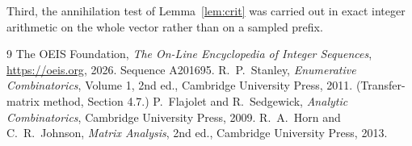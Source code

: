 \documentclass[11pt,a4paper]{article}
\theoremstyle{plain}
\theoremstyle{definition}
\begin{document}
Third, the annihilation test of Lemma~\ref{lem:crit} was carried out in exact integer
arithmetic on the whole vector rather than on a sampled prefix.

\begin{thebibliography}{9}
 The OEIS Foundation, \emph{The On-Line Encyclopedia of Integer
Sequences}, \url{https://oeis.org}, 2026. Sequence A201695.
 R.~P.~Stanley, \emph{Enumerative Combinatorics}, Volume 1, 2nd ed.,
Cambridge University Press, 2011. (Transfer-matrix method, Section 4.7.)
 P.~Flajolet and R.~Sedgewick, \emph{Analytic Combinatorics}, Cambridge
University Press, 2009.
 R.~A.~Horn and C.~R.~Johnson, \emph{Matrix Analysis}, 2nd ed., Cambridge
University Press, 2013.
\end{thebibliography}
\end{document}
